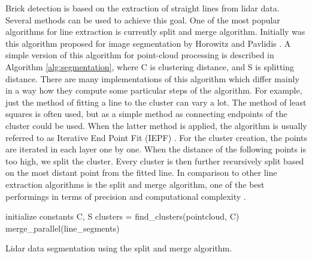 Brick detection is based on the extraction of straight lines from lidar data. Several methods can be used to achieve this goal. One of the most popular algorithms for line extraction is currently split and merge algorithm. Initially was this algorithm proposed for image segmentation by Horowitz and Pavlidis \cite{horowitz1976}. A simple version of this algorithm for point-cloud processing is described in Algorithm \ref{alg:segmentation}, where C is clustering distance, and S is splitting distance. There are many implementations of this algorithm which differ mainly in a way how they compute some particular steps of the algorithm. For example, just the method of fitting a line to the cluster can vary a lot. The method of least squares is often used, but as a simple method as connecting endpoints of the cluster could be used. When the latter method is applied, the algorithm is usually referred to as Iterative End Point Fit (IEPF) \cite{siadat1997}. For the cluster creation, the points are iterated in each layer one by one. When the distance of the following points is too high, we split the cluster. Every cluster is then further recursively split based on the most distant point from the fitted line. In comparison to other line extraction algorithms is the split and merge algorithm, one of the best performings in terms of precision and computational complexity \cite{nguyen2006}.
\begin{algorithm}[]
initialize constants C, S\;
  clusters = find\_clusters(pointcloud, C)\;
merge\_parallel(line\_segments)\;
 
 \caption{Lidar data segmentation using the split and merge algorithm.}
 \label{alg:segmentation}
\end{algorithm}


